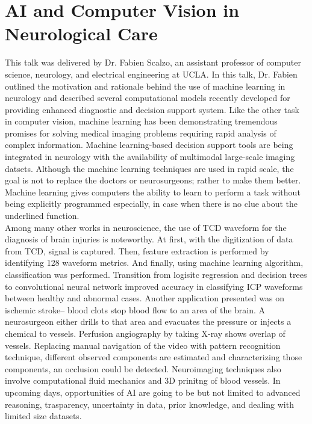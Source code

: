 \documentclass{report}
\begin{document}
\section{AI and Computer Vision in Neurological Care}
This talk was delivered by Dr. Fabien Scalzo, an assistant professor of computer science, neurology, and electrical engineering at UCLA. In this talk, Dr. Fabien outlined the motivation and rationale behind the use of machine learning in neurology and described several computational models recently developed for providing enhanced diagnostic and decision support system. Like the other task in computer vision, machine learning has been demonstrating tremendous promises for solving medical imaging problems requiring rapid analysis of complex information. Machine learning-based decision support tools are being integrated in neurology with the availability of multimodal large-scale imaging datsets. Although the machine learning techniques are used in rapid scale, the goal is not to replace the doctors or neurosurgeons; rather to make them better. Machine learning gives computers the ability to learn to perform a task without being explicitly programmed especially, in case when there is no clue about the underlined function. \\

Among many other works in neuroscience, the use of TCD waveform for the diagnosis of brain injuries is noteworthy. At first, with the digitization of data from TCD, signal is captured. Then, feature extraction is performed by identifying 128 waveform metrics. And finally, using machine learning algorithm, classification was performed. Transition from logisitc regression and decision trees to convolutional neural network improved accuracy in classifying ICP waveforms between healthy and abnormal cases. Another application presented was on ischemic stroke-- blood clots stop blood flow to an area of the brain. A neurosurgeon either drills to that area and evacuates the pressure or injects a chemical to vessels. Perfusion angiography by taking X-ray shows overlap of vessels. Replacing manual navigation of the video with pattern recognition technique, different observed components are estimated and characterizing those components, an occlusion could be detected. Neuroimaging techniques also involve computational fluid mechanics and 3D prinitng of blood vessels. In upcoming days, opportunities of AI are going to be but not limited to advanced reasoning, trasparency, uncertainty in data, prior knowledge, and dealing with limited size datasets.      
\end{document}
